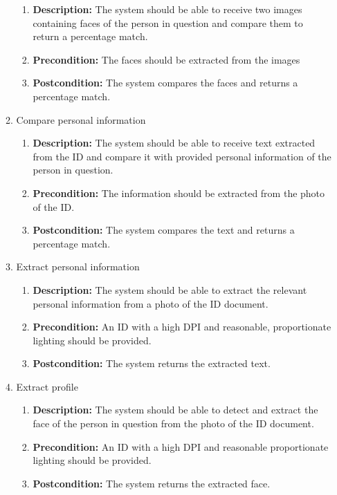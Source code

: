 \documentclass{article}
\begin{document}
\begin{enumerate}
\begin{enumerate}
\begin{enumerate}
					\item \textbf{Description:} The system should be able to receive two images containing faces of the person in question and compare them to return a percentage match.
					\item \textbf{Precondition:} The faces should be extracted from the images
					\item \textbf{Postcondition:} The system compares the faces and returns a percentage match.
				\end{enumerate}
				\item Compare personal information
				\begin{enumerate}
					\item \textbf{Description:} The system should be able to receive text extracted from the ID and compare it with provided personal information of the person in question.
					\item \textbf{Precondition:} The information should be extracted from the photo of the ID.
					\item \textbf{Postcondition:} The system compares the text and returns a percentage match.
				\end{enumerate}
				\item Extract personal information
				\begin{enumerate}
					\item \textbf{Description:} The system should be able to extract the relevant personal information from a photo of the ID document.
					\item \textbf{Precondition:} An ID with a high DPI and reasonable, proportionate lighting should be provided.
					\item \textbf{Postcondition:} The system returns the extracted text.
				\end{enumerate}
				\item Extract profile
				\begin{enumerate}
					\item \textbf{Description:} The system should be able to detect and extract the face of the person in question from the photo of the ID document.
					\item \textbf{Precondition:} An ID with a high DPI and reasonable proportionate lighting should be provided.
					\item \textbf{Postcondition:} The system returns the extracted face.
				\end{enumerate}
			\end{enumerate}
		\end{enumerate}
\end{document}
